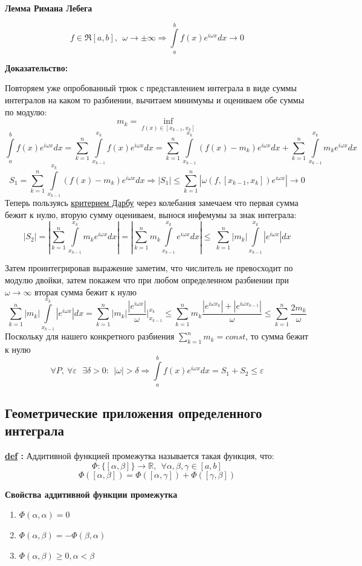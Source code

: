 \documentclass[a4paper,11pt]{article}
\renewcommand{\epsilon}{\ensuremath{\varepsilon}}
\newcommand{\Def}[1]{ 
\noindent\makebox[\linewidth]{\rule{\textwidth}{1pt}} 

 \noindent \textbf{\underline{def} :}
#1 

\noindent\makebox[\linewidth]{\rule{\textwidth}{1pt}} }
\newcommand{\R}{\mathbb{R}}
\newcommand{\Theorem}[3]{ 
\noindent\makebox[\linewidth]{\rule{\textwidth}{2pt}}

\noindent \textbf{#1} 
 
 #2
 
 \noindent\makebox[\linewidth]{\rule{\textwidth}{2pt}}
 \noindent \textbf{Доказательство:}
 
 #3
 
 \noindent\makebox[\linewidth]{\rule{\textwidth}{2pt}}
 }
\newcommand{\Sum}{\sum\limits_{k = 1}^n}
\begin{document}
\Theorem
{ \label{Th:RimLebeg}
Лемма Римана Лебега
}
{
\[
 f \in \Re[a, b], \ \ \omega \to \pm \infty \Rightarrow\int\limits_a^b f(x)e^{i\omega x}dx \to 0
\]
}
{
Повторяем уже опробованный трюк с представлением интеграла в виде суммы интегралов на каком то разбиении, вычитаем минимумы и оцениваем обе суммы по модулю:
\[
m_k = \inf\limits_{f(x) \in [x_{k-1}, x_k]}
\]
\[
\int\limits_a^b f(x)e^{i\omega x}dx = \Sum \int\limits_{x_{k-1}}^{x_k} f(x)e^{i\omega x}dx = 
\Sum \int\limits_{x_{k-1}}^{x_k} (f(x) - m_k)e^{i\omega x}dx + \Sum \int\limits_{x_{k-1}}^{x_k} m_k e^{i\omega x}dx
\]
\[
S_1 = \Sum \int\limits_{x_{k-1}}^{x_k} (f(x) - m_k)e^{i\omega x}dx \Rightarrow |S_1| \leq \Sum | \omega(f, [x_{k-1}, x_k])e^{i\omega x} |\to 0 
\]
Теперь пользуясь \hyperref[Th:kdarbu]{критерием Дарбу} через колебания замечаем что первая сумма бежит к нулю, вторую сумму оцениваем, вынося инфемумы за знак интеграла:
\[
|S_2| = \left|\Sum \int\limits_{x_{k-1}}^{x_k} m_k e^{i\omega x}dx \right| = \left| \Sum m_k \int\limits_{x_{k-1}}^{x_k} e^{i\omega x}dx \right| \leq \ \Sum |m_k| \int\limits_{x_{k-1}}^{x_k} |e^{i\omega x}|dx 
\]

Затем проинтегрировав выражение заметим, что числитель не превосходит по модулю двойки, затем покажем что при любом определенном разбиении при $\omega \to \infty$ вторая сумма бежит к нулю
\[
\Sum |m_k| \int\limits_{x_{k-1}}^{x_k} |e^{i\omega x}|dx = \Sum |m_k| \dfrac{|e^{i\omega x}|}{\omega} \bigg|_{x_{k-1}}^{x_k} \leq \Sum m_k \dfrac{|e^{i\omega x_k}| + |e^{i \omega x_{k-1}}|}{\omega} \leq \Sum \dfrac{2m_k}{\omega}
\]
Поскольку для нашего конкретного разбиения $\Sum m_k = const$, то сумма бежит к нулю
\[
\forall P, \ \forall \epsilon \ \ \ \exists \delta >0: \ \ |\omega| > \delta \Rightarrow \int\limits_a^b f(x) e^{i\omega x}dx = S_1 + S_2 \leq \epsilon
\]
}

\subsection{Геометрические приложения определенного интеграла}

\Def
{\label{def:addfunc}
Аддитивной функцией промежутка называется такая функция, что:
\[
\Phi: \{[\alpha, \beta]\} \to \R, \ \ \forall \alpha, \beta, \gamma \in  [a, b]
\]
\[
\Phi([\alpha, \beta]) = \Phi([\alpha, \gamma]) + \Phi([\gamma, \beta])
\]
}

\textbf{Свойства аддитивной функции промежутка}

 \begin{enumerate}
 	\item $\Phi(\alpha, \alpha) = 0$
 	\item $\Phi(\alpha, \beta) = -\Phi(\beta, \alpha)$
 	\item $\Phi(\alpha, \beta) \geq 0, \alpha < \beta$
 \end{enumerate}
\end{document}
